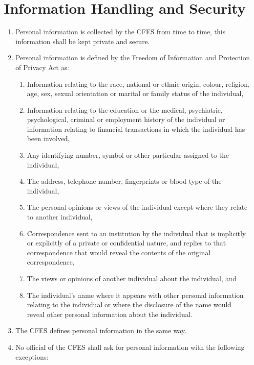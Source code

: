 \section{Information Handling and Security}
\label{information-handling-and-security}

\begin{enumerate}
 \item
  Personal information is collected by the CFES from time to time, this information shall be kept private and secure.
 \item
  Personal information is defined by the Freedom of Information and Protection of Privacy Act as:

  \begin{enumerate}
   \item
    Information relating to the race, national or ethnic origin, colour, religion, age, sex, sexual orientation or marital or family status of the individual,
   \item
    Information relating to the education or the medical, psychiatric, psychological, criminal or employment history of the individual or information relating to financial transactions in which the individual has been involved,
   \item
    Any identifying number, symbol or other particular assigned to the individual,
   \item
    The address, telephone number, fingerprints or blood type of the individual,
   \item
    The personal opinions or views of the individual except where they relate to another individual,
   \item
    Correspondence sent to an institution by the individual that is implicitly or explicitly of a private or confidential nature, and replies to that correspondence that would reveal the contents of the original correspondence,
   \item
    The views or opinions of another individual about the individual, and
   \item
    The individual's name where it appears with other personal information relating to the individual or where the disclosure of the name would reveal other personal information about the individual.
  \end{enumerate}

 \item
  The CFES defines personal information in the same way.
 \item
  No official of the CFES shall ask for personal information with the following exceptions:


\end{enumerate}
